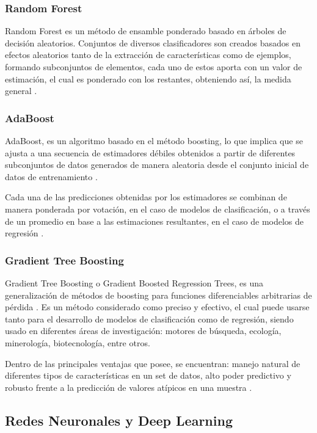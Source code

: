 \subsubsection{Random Forest \label{rf}}

Random Forest es un método de ensamble ponderado basado en árboles de decisión aleatorios. Conjuntos de diversos clasificadores son creados basados en efectos aleatorios tanto de la extracción de características como de ejemplos, formando subconjuntos de elementos, cada uno de estos aporta con un valor de estimación, el cual es ponderado con los restantes, obteniendo así, la medida general \cite{breiman1998}.

\subsubsection{AdaBoost}

AdaBoost, es un algoritmo basado en el método boosting, lo que implica que se ajusta a una secuencia de estimadores débiles obtenidos a partir de diferentes subconjuntos de datos generados de manera aleatoria desde el conjunto inicial de datos de entrenamiento \cite{CAO2013745}. 

Cada una de las predicciones obtenidas por los estimadores se combinan de manera ponderada por votación, en el caso de modelos de clasificación, o a través de un promedio en base a las estimaciones resultantes, en el caso de modelos de regresión \cite{hastie2009multi}. 

\subsubsection{Gradient Tree Boosting}

Gradient Tree Boosting o Gradient Boosted Regression Trees, es una generalización de métodos de boosting para funciones diferenciables arbitrarias de pérdida \cite{gradient}. Es un método considerado como preciso y efectivo, el cual puede usarse tanto para el desarrollo de modelos de clasificación como de regresión, siendo usado en diferentes áreas de investigación: motores de búsqueda, ecología, minerología, biotecnología, entre otros.

Dentro de las principales ventajas que posee, se encuentran: manejo natural de diferentes tipos de características en un set de datos, alto poder predictivo y robusto frente a la predicción de valores atípicos en una muestra \cite{FRIEDMAN2002367}.

\subsection{Redes Neuronales y Deep Learning}

